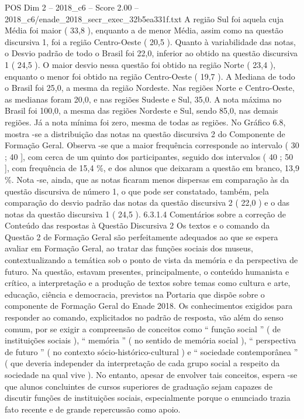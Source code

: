 \begin{textsample}{POS Dim 2 – 2018\_c6 – Score 2.00 – 2018\_c6/enade\_2018\_secr\_exec\_32b5ea331f.txt}
A região Sul foi aquela cuja Média foi maior ( 33,8 ), enquanto a de menor Média, assim como na questão discursiva 1, foi a região Centro-Oeste ( 20,5 ).
Quanto à variabilidade das notas, o Desvio padrão de todo o Brasil foi 22,0, inferior ao obtido na questão discursiva 1 ( 24,5 ).
O maior desvio nessa questão foi obtido na região Norte ( 23,4 ), enquanto o menor foi obtido na região Centro-Oeste ( 19,7 ).
A Mediana de todo o Brasil foi 25,0, a mesma da região Nordeste.
Nas regiões Norte e Centro-Oeste, as medianas foram 20,0, e nas regiões Sudeste e Sul, 35,0.
A nota máxima no Brasil foi 100,0, a mesma das regiões Nordeste e Sul, sendo 85,0, nas demais regiões.
Já a nota mínima foi zero, mesma de todas as regiões.
No Gráfico 6.8, mostra -se a distribuição das notas na questão discursiva 2 do Componente de Formação Geral.
Observa -se que a maior frequência corresponde ao intervalo ( 30 ; 40 ], com cerca de um quinto dos participantes, seguido dos intervalos ( 40 ; 50 ], com frequência de 15,4 \%, e dos alunos que deixaram a questão em branco, 13,9 \%.
Nota -se, ainda, que as notas ficaram menos dispersas em comparação às da questão discursiva de número 1, o que pode ser constatado, também, pela comparação do desvio padrão das notas da questão discursiva 2 ( 22,0 ) e o das notas da questão discursiva 1 ( 24,5 ). 6.3.1.4 Comentários sobre a correção de Conteúdo das respostas à Questão Discursiva 2 Os textos e o comando da Questão 2 de Formação Geral são perfeitamente adequados ao que se espera avaliar em Formação Geral, ao tratar das funções sociais dos museus, contextualizando a temática sob o ponto de vista da memória e da perspectiva de futuro.
Na questão, estavam presentes, principalmente, o conteúdo humanista e crítico, a interpretação e a produção de textos sobre temas como cultura e arte, educação, ciência e democracia, previstos na Portaria que dispõe sobre o componente de Formação Geral do Enade 2018.
Os conhecimentos exigidos para responder ao comando, explicitados no padrão de resposta, vão além do senso comum, por se exigir a compreensão de conceitos como “ função social ” ( de instituições sociais ), “ memória ” ( no sentido de memória social ), “ perspectiva de futuro ” ( no contexto sócio-histórico-cultural ) e “ sociedade contemporânea ” ( que deveria independer da interpretação de cada grupo social a respeito da sociedade na qual vive ).
No entanto, apesar de envolver tais conceitos, espera -se que alunos concluintes de cursos superiores de graduação sejam capazes de discutir funções de instituições sociais, especialmente porque o enunciado trazia fato recente e de grande repercussão como apoio.

\end{textsample}
